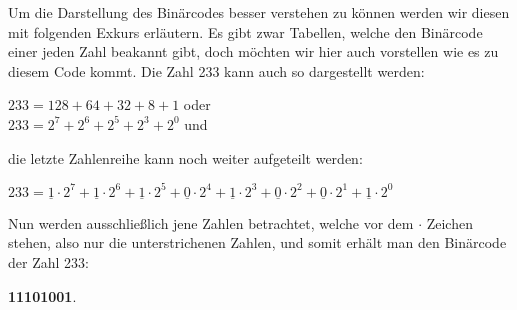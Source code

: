 \documentclass[12pt,a4paper]{article}
\theoremstyle{definition}
\begin{document}
Um die Darstellung des Binärcodes besser verstehen zu können werden wir diesen mit folgenden Exkurs erläutern.
\label{Binärcode der Zahl 233} Es gibt zwar Tabellen, welche den Binärcode einer jeden Zahl beakannt gibt, doch möchten wir hier auch vorstellen wie es zu diesem Code kommt.
Die Zahl 233 kann auch so dargestellt werden:
\begin{center}
$233 = 128 + 64 + 32 + 8 + 1$ oder \\
$233 = 2^7 + 2^6 + 2^5 + 2^3 + 2^0$ und \\
\end{center}
die letzte Zahlenreihe kann noch weiter aufgeteilt werden:
\begin{center}
$233 = \underline{1} \cdot 2^7 + \underline{1} \cdot 2^6 + \underline{1} \cdot 2^5 + \underline{0} \cdot2^4 + \underline{1} \cdot 2^3 + \underline{0} \cdot2^2 + \underline{0} \cdot 2^1 + \underline{1} \cdot 2^0$
\end{center}
Nun werden ausschließlich jene Zahlen betrachtet, welche vor dem $\cdot$ Zeichen stehen, also nur die unterstrichenen Zahlen, und somit erhält man den Binärcode der Zahl 233:
\begin{center}
\textbf{11101001}.
\end{center}
\end{document}
